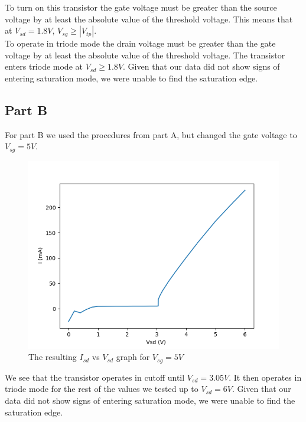 \FloatBarrier
To turn on this transistor the gate voltage must be greater than the source voltage by at least the absolute value of the threshold voltage. 
This means that at $V_{sd} = 1.8 V$, $V_{sg} \ge |V_{tp}|$.
\\

To operate in triode mode the drain voltage must be greater than the gate voltage by at least the absolute value of the threshold voltage.
The transistor enters triode mode at $ V_{sd} \ge 1.8V$.
Given that our data did not show signs of entering saturation mode, we were unable to find the saturation edge.
\\

\subsection{Part B}
For part B we used the procedures from part A, but changed the gate voltage to $V_{sg} = 5 V$. 

\FloatBarrier

\begin{figure}[h!]
	\centering
	\includegraphics[scale=0.75]{./data/pmos_5v.png}
	\caption{The resulting $I_{sd}$ vs $V_{sd}$ graph for $V_{sg}=5V$}
	\label{fig:pmos_5v}
\end{figure}

\FloatBarrier
We see that the transistor operates in cutoff until $V_{sd} = 3.05 V$.
It then operates in triode mode for the rest of the values we tested up to $V_{sd}=6V$.
Given that our data did not show signs of entering saturation mode, we were unable to find the saturation edge.
